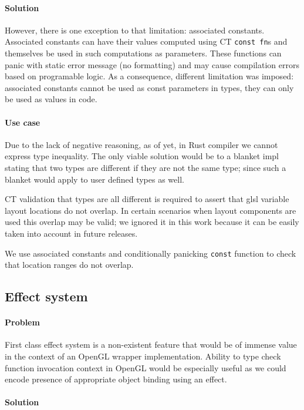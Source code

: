 \paragraph{Solution}

However, there is one exception to that limitation: associated constants. Associated constants can have their values computed using CT \texttt{const fn}s and themselves be used in such computations as parameters.
These functions can panic with static error message (no formatting) and may cause compilation errors based on programable logic.
As a consequence, different limitation was imposed: associated constants cannot be used as const parameters in types, they can only be used as values in code.

\paragraph{Use case}

Due to the lack of negative reasoning, as of yet, in Rust compiler we cannot express type inequality.
The only viable solution would be to a blanket impl stating that two types are different if they are not the same type; since such a blanket would apply to user defined types as well.

CT validation that types are all different is required to assert that glsl variable layout locations do not overlap.
In certain scenarios when layout components are used this overlap may be valid; we ignored it in this work because it can be easily taken into account in future releases.

We use associated constants and conditionally panicking \texttt{const} function to check that location ranges do not overlap.

\subsection{Effect system}

\paragraph{Problem}

First class effect system is a non-existent feature that would be of immense value in the context of an OpenGL wrapper implementation.
Ability to type check function invocation context in OpenGL would be especially useful as we could encode presence of appropriate object binding using an effect.

\paragraph{Solution}

